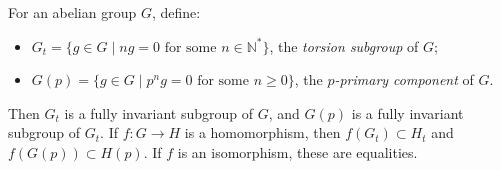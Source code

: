 For an abelian group $G$, define:
\begin{itemize}
\item $G_t = \{g \in G \mid ng = 0 \text{ for some } n \in \mathbb{N}^*\}$, the \emph{torsion subgroup} of $G$;
\item $G(p) = \{g \in G \mid p^ng = 0 \text{ for some } n \geq 0\}$, the \emph{$p$-primary component} of $G$.
\end{itemize}
Then $G_t$ is a fully invariant subgroup of $G$, and $G(p)$ is a fully invariant subgroup of $G_t$. If $f: G \to H$ is a homomorphism, then $f(G_t) \subset H_t$ and $f(G(p)) \subset H(p)$. If $f$ is an isomorphism, these are equalities.
